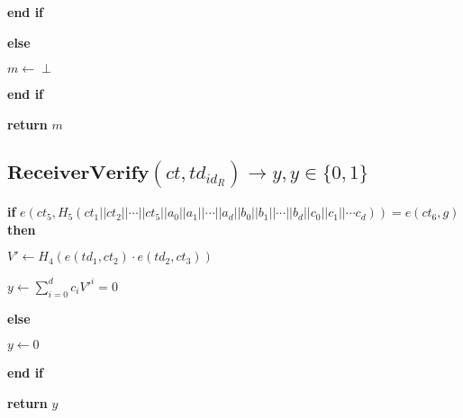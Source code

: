 \documentclass[a4paper]{article}
\begin{document}
\quad\textbf{end if}

\textbf{else}

\quad$m \gets \perp$

\textbf{end if}

\textbf{return} $m$

\subsection{$\textbf{ReceiverVerify}(\textit{ct}, \textit{td}_{\textit{id}_R}) \rightarrow y, y \in \{0, 1\}$}

\textbf{if} $e(\textit{ct}_5, H_5(\textit{ct}_1 || \textit{ct}_2 || \cdots || \textit{ct}_5 || a_0 || a_1 || \cdots || a_d || b_0 || b_1 || \cdots || b_d || c_0 || c_1 || \cdots c_d)) = e(\textit{ct}_6, g)$ \textbf{then}

\quad$V' \gets H_4(e(\textit{td}_1, \textit{ct}_2) \cdot e(\textit{td}_2, \textit{ct}_3))$

\quad$y \gets \sum\limits_{i = 0}^d c_i V'^i = 0$

\textbf{else}

\quad$y \gets 0$

\textbf{end if}

\textbf{return} $y$
\end{document}
